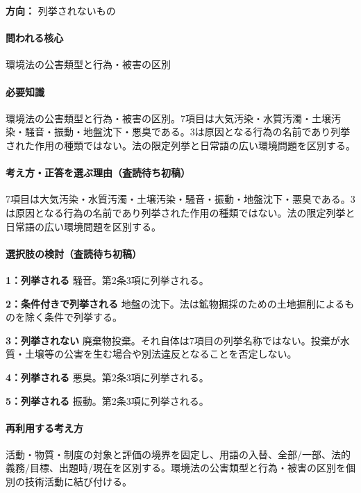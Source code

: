 \noindent\textbf{方向：} 列挙されないもの\par

\paragraph{問われる核心} 環境法の公害類型と行為・被害の区別

\paragraph{必要知識} 環境法の公害類型と行為・被害の区別。7項目は大気汚染・水質汚濁・土壌汚染・騒音・振動・地盤沈下・悪臭である。3は原因となる行為の名前であり列挙された作用の種類ではない。法の限定列挙と日常語の広い環境問題を区別する。

\paragraph{考え方・正答を選ぶ理由（査読待ち初稿）} 7項目は大気汚染・水質汚濁・土壌汚染・騒音・振動・地盤沈下・悪臭である。3は原因となる行為の名前であり列挙された作用の種類ではない。法の限定列挙と日常語の広い環境問題を区別する。

\paragraph{選択肢の検討（査読待ち初稿）}\mbox{}\par

\noindent\textbf{1：列挙される} 騒音。第2条3項に列挙される。\par

\noindent\textbf{2：条件付きで列挙される} 地盤の沈下。法は鉱物掘採のための土地掘削によるものを除く条件で列挙する。\par

\noindent\textbf{3：列挙されない} 廃棄物投棄。それ自体は7項目の列挙名称ではない。投棄が水質・土壌等の公害を生む場合や別法違反となることを否定しない。\par

\noindent\textbf{4：列挙される} 悪臭。第2条3項に列挙される。\par

\noindent\textbf{5：列挙される} 振動。第2条3項に列挙される。\par

\paragraph{再利用する考え方} 活動・物質・制度の対象と評価の境界を固定し、用語の入替、全部/一部、法的義務/目標、出題時/現在を区別する。環境法の公害類型と行為・被害の区別を個別の技術活動に結び付ける。

